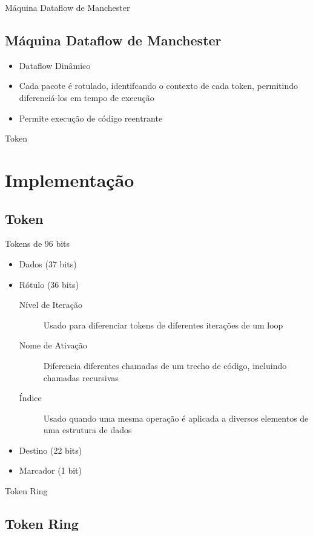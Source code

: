 \documentclass{beamer}
\begin{document}
\begin{frame}{Máquina Dataflow de Manchester}
	\subsection{Máquina Dataflow de Manchester}
	\begin{itemize}
		\item Dataflow Dinâmico
		\item Cada pacote é rotulado, identifcando o contexto de cada token, permitindo diferenciá-los em tempo de execução
		\item Permite execução de código reentrante
	\end{itemize}
\end{frame}

\begin{frame}{Token}
	\section{Implementação}
	\subsection{Token}
	
	Tokens de 96 bits
		\begin{itemize}
			\item Dados (37 bits)
			\item Rótulo (36 bits)
			\begin{description}
				\item[Nível de Iteração] Usado para diferenciar tokens de diferentes iterações de um loop
				\item[Nome de Ativação] Diferencia diferentes chamadas de um trecho de código, incluindo chamadas recursivas
				\item[Índice] Usado quando uma mesma operação é aplicada a diversos elementos de uma estrutura de dados
			\end{description}
			\item Destino (22 bits)
			\item Marcador (1 bit)
		\end{itemize}
\end{frame}

\begin{frame}{Token Ring}
	\subsection{Token Ring}
\end{frame}
\end{document}
